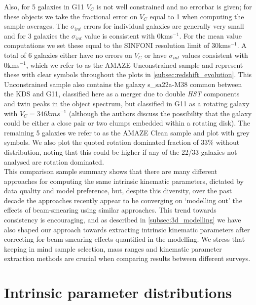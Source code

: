 \documentclass[fleqn,usenatbib]{mn2e}
\begin{document}
Also, for 5 galaxies in G11 $V_{C}$ is not well constrained and no errorbar is given; for these objects we take the fractional error on $V_{C}$ equal to 1 when computing the sample averages.
The $\sigma_{int}$ errors for individual galaxies are generally very small and for 3 galaxies the $\sigma_{int}$ value is consistent with 0kms$^{-1}$.
For the mean value computations we set these equal to the SINFONI resolution limit of 30kms$^{-1}$.
A total of 6 galaxies either have no errors on $V_{C}$ or have $\sigma_{int}$ values consistent with 0kms$^{-1}$, which we refer to as the AMAZE Unconstrained sample and represent these with clear symbols throughout the plots in \cref{subsec:redshift_evolution}.
This Unconstrained sample also contains the galaxy s\_sa22a-M38 common between the KDS and G11, classified here as a merger due to double {\em HST} components and twin peaks in the object spectrum, but classified in G11 as a rotating galaxy with $V_{C} = 346kms^{-1}$ (although the authors discuss the possibility that the galaxy could be either a close pair or two clumps embedded within a rotating disk).
The remaining 5 galaxies we refer to as the AMAZE Clean sample and plot with grey symbols.
We also plot the quoted rotation dominated fraction of 33$\%$ without distribution, noting that this could be higher if any of the 22/33 galaxies not analysed are rotation dominated. \\
 
This comparison sample summary shows that there are many different approaches for computing the same intrinsic kinematic parameters, dictated by data quality and model preference, but, despite this diversity, over the past decade the approaches recently appear to be converging on `modelling out' the effects of beam-smearing using similar approaches.
This trend towards consistency is encouraging, and as described in \cref{subsec:3d_modelling} we have also shaped our approach towards extracting intrinsic kinematic parameters after correcting for beam-smearing effects quantified in the modelling.
We stress that keeping in mind sample selection, mass ranges and kinematic parameter extraction methods are crucial when comparing results between different surveys.

\section{Intrinsic parameter distributions}
\end{document}

